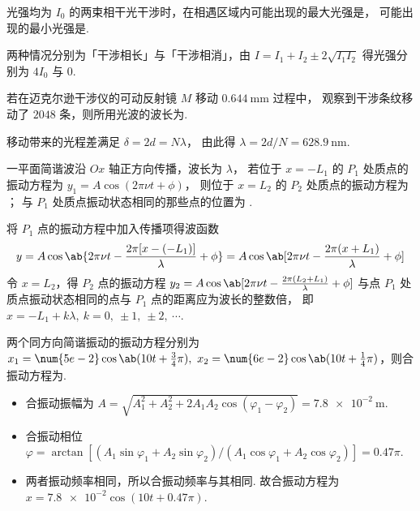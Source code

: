 \begin{problem}[本题2分]
  光强均为 $I_0$ 的两束相干光干涉时，在相遇区域内可能出现的最大光强是，
  可能出现的最小光强是.
\end{problem}
\scratch
\begin{solution}
  两种情况分别为「干涉相长」与「干涉相消」，由 $I = I_1 + I_2 \pm 2\sqrt{I_1I_2}$
  得光强分别为 $4I_0$ 与 $0$.
\end{solution}

\begin{problem}[本题2分]
  若在迈克尔逊干涉仪的可动反射镜 $M$ 移动 $\qty{0.644}\mm$ 过程中，
  观察到干涉条纹移动了 $2048$ 条，则所用光波的波长为.
\end{problem}
\begin{solution}
  移动带来的光程差满足 $\delta = 2d = N\lambda$，
  由此得 $\lambda = 2d/N = \qty{628.9}\nm$.
\end{solution}

\begin{problem}[本题5分]
  一平面简谐波沿 $Ox$ 轴正方向传播，波长为 $\lambda$，
  若位于 $x = -L_1$ 的 $P_1$ 处质点的振动方程为 $y_1 = A\cos(2\pi\nu t + \phi)$，
  则位于 $x = L_2$ 的 $P_2$ 处质点的振动方程为
  ；
  与 $P_1$ 处质点振动状态相同的那些点的位置为
  .
\end{problem}
\scratch[3ex]
\begin{solution}
  将 $P_1$ 点的振动方程中加入传播项得波函数
  \[
    y = A\cos\ab\{2\pi\nu t - \frac{2\pi[x - (-L_1)]}{\lambda} + \phi\}
      = A\cos\ab[2\pi\nu t - \frac{2\pi(x + L_1)}{\lambda} + \phi]
  \]
  令 $x = L_2$，得 $P_2$ 点的振动方程
  $y_2 = A\cos\ab[2\pi\nu t - \frac{2\pi(L_2 + L_1)}{\lambda} + \phi]$
  与点 $P_1$ 处质点振动状态相同的点与 $P_1$ 点的距离应为波长的整数倍，
  即 $x = -L_1 + k\lambda,~ k = 0,~ \pm 1,~ \pm 2,~ \cdots$.
\end{solution}

\begin{problem}[本题3分]
  两个同方向简谐振动的振动方程分别为
  $ x_1 = \num{5e-2}\cos\ab(10t + \frac34\pi),~
    x_2 = \num{6e-2}\cos\ab(10t + \frac14\pi)
  $，则合振动方程为.
\end{problem}
\scratch[1ex]
\begin{solution}\leavevmode
  \begin{itemize}
    \item 合振动振幅为
    $ A = \sqrt{A_1^2 + A_2^2 + 2A_1A_2\cos(\varphi_1 - \varphi_2)}
        = \qty{7.8e-2}\m$.
    \item 合振动相位
    $\varphi = \arctan[
        (A_1\sin\varphi_1 + A_2\sin\varphi_2)/
        (A_1\cos\varphi_1 + A_2\cos\varphi_2)
      ] = 0.47\pi$.
    \item 两者振动频率相同，所以合振动频率与其相同.
    故合振动方程为 $x = \num{7.8e-2}\cos(10t + 0.47\pi)$.
  \end{itemize}
\end{solution}

